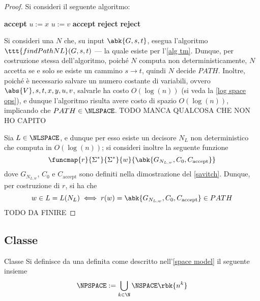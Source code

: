 \documentclass[a4paper, 12pt]{report}
\begin{document}
    \begin{proof}
        Si consideri il seguente algoritmo:

        \begin{algorithmic}[1]
                    \State \textbf{accept}
                \EndIf
                \State $u := x$
                 
                        \State $u := v$
                            \State \textbf{accept}
                        \EndIf
                    \Else
                        \State \textbf{reject} 
                    \EndIf
                \EndFor
                \State \textbf{reject} 
            \EndFunction
        \end{algorithmic}

        Si consideri una \NTM $N$ che, su input $\abk{G, s, t}$, esegua l'algoritmo $\ttt{findPathNL}(G, s, t)$ --- la quale esiste per l'\cref{alg tm}. Dunque, per costruzione stessa dell'algoritmo, poiché $N$ computa non deterministicamente, $N$ accetta se e solo se esiste un cammino $s \to t$, quindi $N$ decide $PATH$. Inoltre, poiché è necessario salvare un numero costante di variabili, ovvero $\abs{V}, s, t, x, y, u, v$, salvarle ha costo $O(\log(n))$ (si veda la \cref{log space ops}), e dunque l'algoritmo risulta avere costo di spazio $O(\log(n))$, implicando che $PATH \in \NLSPACE$. TODO MANCA QUALCOSA CHE NON HO CAPITO

        Sia $L \in \NLSPACE$, e dunque per esso esiste un decisore $N_L$ non deterministico che computa in $O(\log(n))$; si consideri inoltre la seguente funzione $$\funcmap{r}{\Sigma^*}{\Sigma^*}{w}{\abk{G_{N_{L, w}}, C_0, C_\mathrm{accept}}}$$ dove $G_{N_{L, w}}$, $C_0$ e $C_\mathrm{accept}$ sono definiti nella dimostrazione del \cref{savitch}. Dunque, per costruzione di $r$, si ha che $$w \in L = L(N_L) \iff r(w) = \abk{G_{N_{L, w}}, C_0, C_\mathrm{accept}} \in PATH$$ TODO DA FINIRE
    \end{proof}

    \subsection{Classe \NPSPACE}

    \begin{frameddefn}{Classe \NPSPACE}
        Si definisce  da una \NTM definita come descritto nell'\cref{space model} il seguente insieme $$\NPSPACE := \bigcup_{k \in \N}{\NSPACE \rbk{n^k}}$$
    \end{frameddefn}
\end{document}
